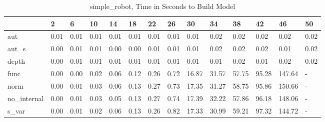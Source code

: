 \begin{table}
\caption{simple_robot, Time in Seconds to Build Model}
\label{simple_robot_model_time}
\begin{tabular}{llllllllllllll}
\toprule
 & 2 & 6 & 10 & 14 & 18 & 22 & 26 & 30 & 34 & 38 & 42 & 46 & 50 \\
\midrule
aut & 0.01 & 0.01 & 0.01 & 0.01 & 0.01 & 0.01 & 0.01 & 0.01 & 0.02 & 0.02 & 0.02 & 0.02 & 0.02 \\
aut_s & 0.00 & 0.01 & 0.01 & 0.00 & 0.00 & 0.01 & 0.01 & 0.01 & 0.02 & 0.02 & 0.02 & 0.01 & 0.02 \\
depth & 0.00 & 0.01 & 0.01 & 0.01 & 0.01 & 0.01 & 0.01 & 0.01 & 0.01 & 0.02 & 0.01 & 0.02 & 0.02 \\
func & 0.00 & 0.00 & 0.02 & 0.06 & 0.12 & 0.26 & 0.72 & 16.87 & 31.57 & 57.75 & 95.28 & 147.64 & - \\
norm & 0.00 & 0.01 & 0.03 & 0.06 & 0.13 & 0.27 & 0.73 & 17.35 & 31.27 & 58.75 & 95.86 & 150.66 & - \\
no_internal & 0.00 & 0.01 & 0.03 & 0.05 & 0.13 & 0.27 & 0.74 & 17.39 & 32.22 & 57.86 & 96.18 & 148.06 & - \\
s_var & 0.00 & 0.01 & 0.02 & 0.06 & 0.13 & 0.26 & 0.82 & 17.33 & 30.99 & 59.21 & 97.32 & 144.72 & - \\
\bottomrule
\end{tabular}
\end{table}
